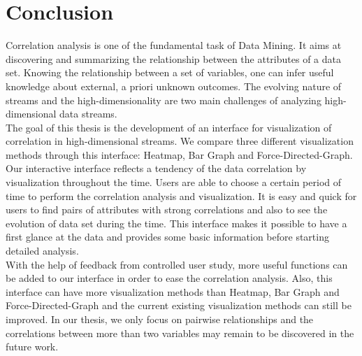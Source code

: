 
\chapter{Conclusion}
\label{ch:Conclusion}
Correlation analysis is one of the fundamental task of Data Mining. It aims at discovering and summarizing the relationship between the attributes of a data set. Knowing the relationship between a set of variables, one can infer useful knowledge about external, a priori unknown outcomes. The evolving nature of streams and the high-dimensionality are two main challenges of analyzing high-dimensional data streams.\\
The goal of this thesis is the development of an interface for visualization of correlation in high-dimensional streams. We compare three different visualization methods through this interface: Heatmap, Bar Graph and Force-Directed-Graph. Our interactive interface reflects a tendency of the data correlation by visualization throughout the time. Users are able to choose a certain period of time to perform the correlation analysis and visualization. It is easy and quick for users to find pairs of attributes with strong correlations and also to see the evolution of data set during the time. This interface makes it possible to have a first glance at the data and provides some basic information before starting detailed analysis.\\
With the help of feedback from controlled user study, more useful functions can be added to our interface in order to ease the correlation analysis. Also, this interface can have more visualization methods than Heatmap, Bar Graph and Force-Directed-Graph and the current existing visualization methods can still be improved. In our thesis, we only focus on pairwise relationships and the correlations between more than two variables may remain to be discovered in the future work.\\





